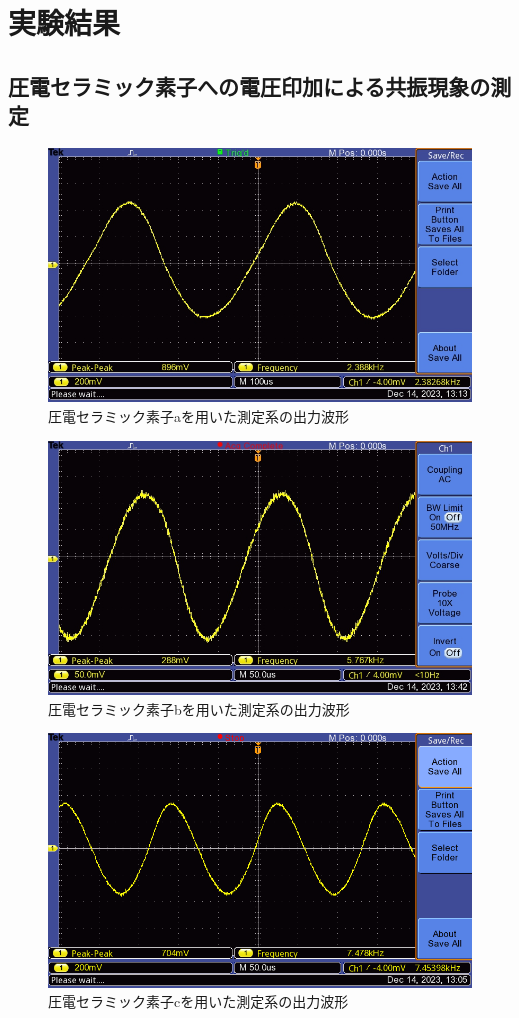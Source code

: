 \documentclass{ltjsarticle}
\begin{document}
\section{実験結果}
	\subsection{圧電セラミック素子への電圧印加による共振現象の測定}
		\begin{figure}[H]
		\centering
		\includegraphics[width = 12cm]{figs/week4big.JPG}
		\caption{圧電セラミック素子aを用いた測定系の出力波形}
		\label{fig:圧電a}
		\end{figure}

		\begin{figure}[H]
		\centering
		\includegraphics[width = 12cm]{figs/week4mid.JPG}
		\caption{圧電セラミック素子bを用いた測定系の出力波形}
		\label{fig:圧電b}
		\end{figure}
		
		\begin{figure}[H]
		\centering
		\includegraphics[width = 12cm]{figs/week4small.png}
		\caption{圧電セラミック素子cを用いた測定系の出力波形}
		\label{fig:圧電c}
		\end{figure}
		
\end{document}
